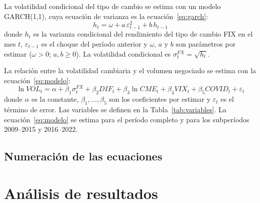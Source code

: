 
La volatilidad condicional del tipo de cambio se estima con un modelo GARCH(1,1), cuya ecuación de varianza es la ecuación~\eqref{eq:garch}:
\begin{equation}
h_t = \omega + a\,\varepsilon_{t-1}^{2} + b\,h_{t-1}
\label{eq:garch}
\end{equation}
donde $h_t$ es la varianza condicional del rendimiento del tipo de cambio FIX en el mes $t$, $\varepsilon_{t-1}$ es el choque del período anterior y $\omega$, $a$ y $b$ son parámetros por estimar ($\omega > 0$; $a, b \geq 0$). La volatilidad condicional es $\sigma_t^{FX} = \sqrt{h_t}$.

La relación entre la volatilidad cambiaria y el volumen negociado se estima con la ecuación~\eqref{eq:modelo}:
\begin{equation}
\ln \mathit{VOL}_t = \alpha + \beta_1 \sigma_t^{FX} + \beta_2 \mathit{DIF}_t + \beta_3 \ln \mathit{CME}_t + \beta_4 \mathit{VIX}_t + \beta_5 \mathit{COVID}_t + \varepsilon_t
\label{eq:modelo}
\end{equation}
donde $\alpha$ es la constante, $\beta_1, \ldots, \beta_5$ son los coeficientes por estimar y $\varepsilon_t$ es el término de error. Las variables se definen en la Tabla~\ref{tab:variables}. La ecuación~\eqref{eq:modelo} se estima para el período completo y para los subperíodos 2009--2015 y 2016--2022.

\subsection{Numeración de las ecuaciones}


\section{Análisis de resultados}

